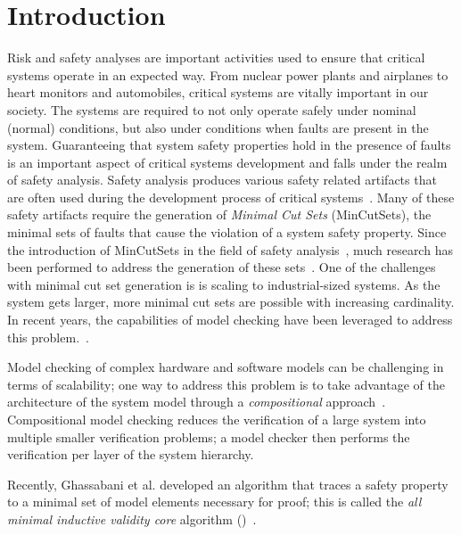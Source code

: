 \section{Introduction}
\label{sec:intro}

Risk and safety analyses are important activities used to ensure that critical systems operate in an expected way. From nuclear power plants and airplanes to heart monitors and automobiles, critical systems are vitally important in our society. The systems are required to not only operate safely under nominal (normal) conditions, but also under conditions when faults are present in the system. Guaranteeing that system safety properties hold in the presence of faults is an important aspect of critical systems development and falls under the realm of safety analysis. Safety analysis produces various safety related artifacts that are often used during the development process of critical systems~\cite{SAE:ARP4761,SAE:ARP4754A}. Many of these safety artifacts require the generation of \textit{Minimal Cut Sets} (MinCutSets), the minimal sets of faults that cause the violation of a system safety property. Since the introduction of MinCutSets in the field of safety analysis~\cite{vesely1981fault}, much research has been performed to address the generation of these sets~\cite{fta:survey,rauzy1993new,historyFTA,Bozzano:2010:DSA:1951720,rausand2003system}. One of the challenges with minimal cut set generation is is scaling to industrial-sized systems. As the system gets larger, more minimal cut sets are possible with increasing cardinality. In recent years, the capabilities of model checking have been leveraged to address this problem.~\cite{bieber2002combination,schafer2003combining,fta:survey,contractBasedDesign,symbFTA,DBLP:conf/cav/BozzanoCPJKPRT15}. 

Model checking of complex hardware and software models can be challenging in terms of scalability; one way to address this problem is to take advantage of the architecture of the system model through a \textit{compositional} approach~\cite{anderson1996model, clarke1989compositional,mcmillan1999verification}. Compositional model checking reduces the verification of a large system into multiple smaller verification problems; a model checker then performs the verification per layer of the system hierarchy. 

Recently, Ghassabani et al. developed an algorithm that traces a safety property to a minimal set of model elements necessary for proof; this is called the \textit{all minimal inductive validity core} algorithm (\aivcalg)~\cite{GhassabaniGW16,Ghassabani2017EfficientGO,bendik2018online}. 

